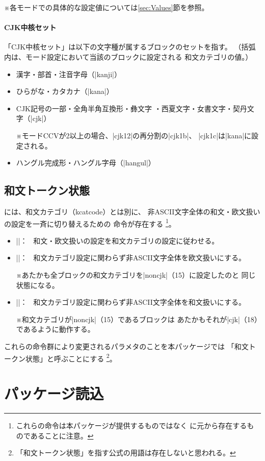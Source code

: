 \documentclass[uplatex,dvipdfmx,a4paper]{jsarticle}
\newcommand{\Note}{\par\noindent ※}
\newcommand{\Means}{：~}
\newcommand{\strong}{\textsf}
\begin{document}
\Note 各モードでの具体的な設定値については\ref{sec:Values}節を参照。

\paragraph{CJK中核セット}
「CJK中核セット」は以下の文字種が属するブロックのセットを指す。
（括弧内は、モード設定において当該のブロックに設定される
和文カテゴリの値。）
  \begin{itemize}
  \item 漢字・部首・注音字母（|kanji|）
  \item ひらがな・カタカナ（|kana|）
   \item CJK記号の一部・全角半角互換形・彝文字
    ・西夏文字・女書文字・契丹文字（|cjk|）
    \Note モードCCVが2以上の場合、|cjk12|の再分割の|cjk1b|、
      |cjk1c|は|kana|に設定される。
  \item ハングル完成形・ハングル字母（|hangul|）
\end{itemize}

\subsection{和文トークン状態}
\label{ssec:cjktoken}

{\upTeX}には、和文カテゴリ（kcatcode）とは別に、
非ASCII文字全体の和文・欧文扱いの設定を一斉に切り替えるための
命令が存在する
\footnote{これらの命令は本パッケージが提供するものではなく
  {\upTeX}に元から存在するものであることに注意。}。
\begin{itemize}
\item |\enablecjktoken|\Means
  和文・欧文扱いの設定を和文カテゴリの設定に従わせる。
\item |\disablecjktoken|\Means
  和文カテゴリ設定に関わらず非ASCII文字全体を欧文扱いにする。
  \Note あたかも全ブロックの和文カテゴリを|noncjk|（15）に設定したのと
  同じ状態になる。
\item |\forcecjktoken|\Means
  和文カテゴリ設定に関わらず非ASCII文字全体を和文扱いにする。
  \Note 和文カテゴリが|noncjk|（15）であるブロックは
  あたかもそれが|cjk|（18）であるように動作する。
\end{itemize}

これらの命令群により変更されるパラメタのことを本パッケージでは
「\strong{和文トークン状態}」と呼ぶことにする
\footnote{「和文トークン状態」を指す公式の用語は存在しないと思われる。}。

\section{パッケージ読込}
\label{sec:Loading}
\end{document}

